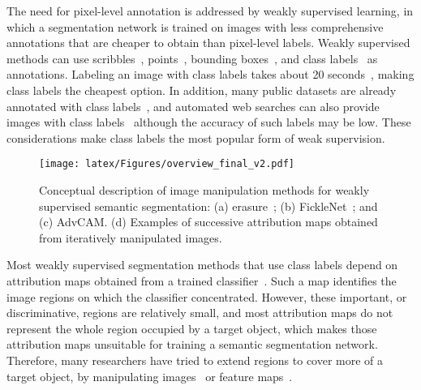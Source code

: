 \documentclass[final]{cvpr}
\begin{document}
The need for pixel-level annotation is addressed by weakly supervised learning, in which a segmentation network is trained on images with less comprehensive annotations that are cheaper to obtain than pixel-level labels. 
Weakly supervised methods can use scribbles~\cite{tang2018normalized}, points~\cite{bearman2016s}, bounding boxes~\cite{khoreva2017simple, song2019box}, and class labels~\cite{lee2019ficklenet, Shimoda_2019_ICCV, ahn2018learning, chang2020weakly} as annotations. 
Labeling an image with class labels takes about 20 seconds~\cite{bearman2016s}, making class labels the cheapest option. 
In addition, many public datasets are already annotated with class labels~\cite{deng2009imagenet, everingham2010pascal}, and automated web searches can also provide images with class labels~\cite{lee2019frame, hong2017weakly, shen2018bootstrapping} although the accuracy of such labels may be low.
These considerations make class labels the most popular form of weak supervision.


\begin{figure}[t]
\centering
\texttt{[image: latex/Figures/overview\_final\_v2.pdf]}
\vspace{-1.5em}
\caption{\label{overview}  Conceptual description of image manipulation methods for weakly supervised semantic segmentation: (a) erasure~\cite{wei2017object, hou2018self, zhang2018adversarial}; (b) FickleNet~\cite{lee2019ficklenet}; and (c) AdvCAM. (d) Examples of successive attribution maps obtained from iteratively manipulated images.}
\vspace{-1.3em}
\end{figure} Most weakly supervised segmentation methods that use class labels depend on attribution maps obtained from a trained classifier~\cite{zhou2016learning, selvaraju2017grad}.
Such a map identifies the image regions on which the classifier concentrated.
However, these important, or discriminative, regions are relatively small, and most attribution maps do not represent the whole region occupied by a target object, which makes those attribution maps unsuitable for training a semantic segmentation network.
Therefore, many researchers have tried to extend regions to cover more of a target object, by manipulating images~\cite{wei2017object, li2018tell, singh2017hide} or feature maps~\cite{lee2019ficklenet, zhang2018adversarial, hou2018self}.
\end{document}
